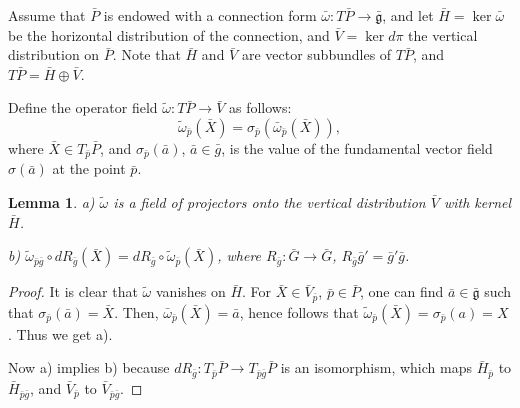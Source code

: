 \documentclass[12pt,letterpaper]{amsart}
\theoremstyle{definition}
\theoremstyle{plain}
\newtheorem{lm}{Lemma}
\theoremstyle{remark}
\begin{document}
Assume that $\bar{P}$ is endowed with a connection form $\bar{\omega}: T\bar{P} \rightarrow \bar{\mathfrak{g}}$, and let
$\bar{H} = \ker\bar{\omega}$ be the horizontal distribution of the connection, and $\bar{V}=\ker d\pi$ the vertical distribution on $\bar{P}$.
Note that $\bar{H}$ and $\bar{V}$ are vector subbundles of $T\bar{P}$, and $T\bar{P}=\bar{H} \oplus \bar{V}$.

Define the operator field $\widetilde{\omega} : T\bar{P} \to \bar{V}$ as follows:
\begin{equation}
\widetilde{\omega}_{\bar{p}}(\bar{X}) = \sigma_{\bar{p}}(\bar{\omega}_{\bar{p}}(\bar{X})),
\label{eq:75}
\end{equation}
where $\bar{X} \in T_{\bar{p}} \bar{P}$, and $\sigma_{\bar{p}}(\bar{a})$, $\bar{a} \in \bar{g}$, is the value of the fundamental vector field $\sigma(\bar{a})$ at the point $\bar{p}$.

\begin{lm}
a) $\widetilde{\omega}$ is a field of projectors onto the vertical distribution $\bar{V}$ with kernel $\bar{H}$.

b) $\widetilde{\omega}_{\bar{p}\bar{g}} \circ dR_{\bar{g}} (\bar{X}) = dR_{\bar{g}} \circ \widetilde{\omega}_{\bar{p}} (\bar{X})$, where $R_{\bar{g}} : \bar{G} \to \bar{G}$, $R_{\bar{g}} \bar{g}' = \bar{g}' \bar{g}$.

\label{lm:3}
\end{lm}
\begin{proof}
It is clear that $\widetilde{\omega}$ vanishes on $\bar{H}$.
For $\bar{X} \in \bar{V}_{\bar{p}}$, $\bar{p} \in \bar{P}$, one can find $\bar{a} \in \bar{\mathfrak{g}}$ such that $\sigma_{\bar{p}}(\bar{a}) = \bar{X}$.
Then, $\bar{\omega}_{\bar{p}}(\bar{X}) = \bar{a}$, hence follows that
$\widetilde{\omega}_{\bar{p}}(\bar{X}) = \sigma_{\bar{p}}(a) = X$.
Thus we get a).

Now a) implies b) because $dR_{\bar{g}} : T_{\bar{p}} \bar{P} \to T_{\bar{p}\bar{g}}\bar{P}$ is an isomorphism, which maps $\bar{H}_{\bar{p}}$ to $\bar{H}_{\bar{p}\bar{g}}$, and $\bar{V}_{\bar{p}}$ to $\bar{V}_{\bar{p}\bar{g}}$.
\end{proof}
\end{document}
